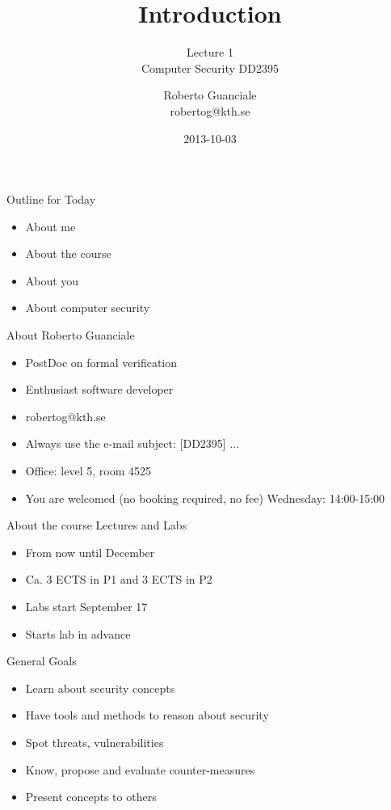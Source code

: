 \documentclass{beamer}
\title{Introduction}
\subtitle{Lecture 1 \\ Computer Security DD2395}
\author[R. Guanciale]{
  Roberto Guanciale\\
  robertog@kth.se
}
\date{2013-10-03}
\begin{document}
\begin{frame}[plain]
  \titlepage
\end{frame}

\begin{frame}{Outline for Today}
  \begin{itemize}
    \item About me
    \item About the course
    \item About you
    \item About computer security
  \end{itemize}
\end{frame}

\begin{frame}{About Roberto Guanciale}
  \begin{itemize}
    \item PostDoc on formal verification
    \item Enthusiast software developer
    \item robertog@kth.se
    \item \alert{Always} use the e-mail subject: [DD2395] ...
    \item Office: level 5, room 4525
    \item You are welcomed (no booking required, no fee) Wednesday:
      14:00-15:00
  \end{itemize}
\end{frame}

\begin{frame}{About the course}
  Lectures and Labs
  \begin{itemize}
    \item From now until December
    \item Ca. 3 ECTS in P1 and 3 ECTS in P2
    \item Labs start September 17
    \item Starts lab in advance
  \end{itemize}
\end{frame}

\begin{frame}{General Goals}
  \begin{itemize}
    \item Learn about security concepts
    \item Have tools and methods to reason about security
    \item Spot threats, vulnerabilities
    \item Know, propose and evaluate counter-measures
    \item Present concepts to others 
  \end{itemize}
\end{frame}
\end{document}
